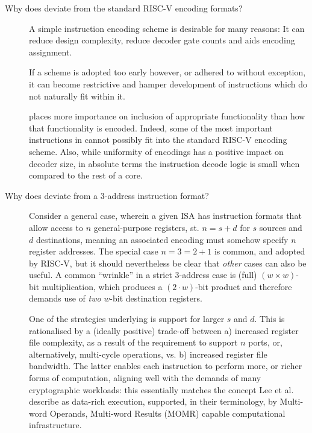 \begin{description}
\begin{itemize}
      \end{itemize}

\item[Why does \XCID deviate from the standard RISC-V encoding formats?]
      A simple instruction encoding scheme is desirable for many reasons:
      It can reduce design complexity, reduce decoder gate counts and
      aids encoding assignment.

      If a scheme is adopted too early however, or adhered to without
      exception, it can become restrictive and hamper development of
      instructions which do not naturally fit within it.

      \XCID places more importance on inclusion of appropriate functionality
      than how that functionality is encoded. Indeed, some of the most
      important instructions in \XCID cannot possibly fit into the standard
      RISC-V encoding scheme. 
      Also, while uniformity of encodings has a positive impact on decoder
      size, in absolute terms the instruction decode logic is small when
      compared to the rest of a core.

\item[Why does \XCID deviate from a $3$-address instruction format?]
      Consider a general case, wherein a given ISA has instruction formats
      that allow access to $n$ general-purpose registers, st. 
      $
      n = s + d
      $ 
      for $s$ sources and $d$ destinations, meaning an associated encoding 
      must somehow specify $n$ register addresses.  The special case
      $
      n = 3 = 2 + 1 
      $
      is common, and adopted by RISC-V, but it should nevertheless be clear
      that {\em other} cases can also be useful.  A common ``wrinkle'' in a 
      strict $3$-address case is (full) $( w \times w )$-bit multiplication, 
      which produces a $(2 \cdot w )$-bit product and therefore demands use 
      of {\em two} $w$-bit destination registers.
   
      One of the strategies underlying \XCID is support for larger $s$ and
      $d$.  This is rationalised by a (ideally positive) trade-off between
      a) increased register file complexity, as a result of the requirement
         to support $n$ ports, or, alternatively, multi-cycle operations,
         vs.
      b) increased register file bandwidth.
      The latter enables each instruction to perform more, or richer forms 
      of computation, aligning well with the demands of many cryptographic 
      workloads: this essentially matches the concept
      Lee et al.~\cite{SCARV:LeeYanShi:04}
      describe as data-rich execution, supported, in their terminology, by 
      Multi-word Operands, Multi-word Results (MOMR)
      capable computational infrastructure.


\end{description}
